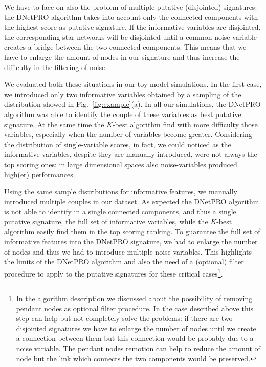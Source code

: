 \documentclass{standalone}
\begin{document}
We have to face on also the problem of multiple putative (disjointed) signatures: the DNetPRO algorithm takes into account only the connected components with the highest score as putative signature.
If the informative variables are disjointed, the corresponding star-networks will be disjointed until a common noise-variable creates a bridge between the two connected components.
This means that we have to enlarge the amount of nodes in our signature and thus increase the difficulty in the filtering of noise.

We evaluated both these situations in our toy model simulations.
In the first case, we introduced only two informative variables obtained by a sampling of the distribution showed in Fig.~\ref{fig:example}(a).
In all our simulations, the DNetPRO algorithm was able to identify the couple of these variables as best putative signature.
At the same time the $K$-best algorithm find with more difficulty those variables, especially when the number of variables become greater.
Considering the distribution of single-variable scores, in fact, we could noticed as the informative variables, despite they are manually introduced, were not always the top scoring ones: in large dimensional spaces also noise-variables produced high(er) performances.

Using the same sample distributions for informative features, we manually introduced multiple couples in our dataset.
As expected the DNetPRO algorithm is not able to identify in a single connected components, and thus a single putative signature, the full set of informative variables, while the $K$-best algorithm easily find them in the top scoring ranking.
To guarantee the full set of informative features into the DNetPRO signature, we had to enlarge the number of nodes and thus we had to introduce multiple noise-variables.
This highlights the limits of the DNetPRO algorithm and also the need of a (optional) filter procedure to apply to the putative signatures for these critical cases\footnote{
  In the algorithm description we discussed about the possibility of removing pendant nodes as optional filter procedure.
  In the case described above this step can help but not completely solve the problems: if there are two disjointed signatures we have to enlarge the number of nodes until we create a connection between them but this connection would be probably due to a noise variable.
  The pendant nodes remotion can help to reduce the amount of node but the link which connects the two components would be preserved.
}.

\end{document}
